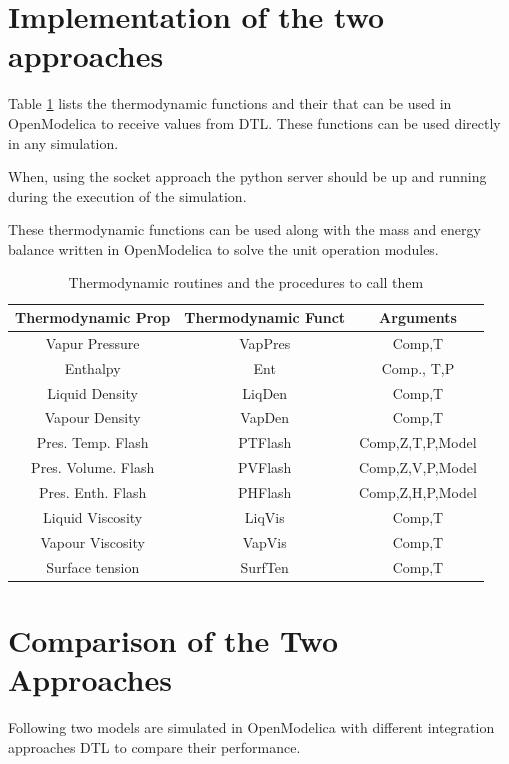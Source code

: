 \documentclass[12pt]{report}
\begin{document}
\section{Implementation of the two approaches}
Table \ref{Prop} lists the thermodynamic functions and their that can be used in OpenModelica to receive values from DTL. These functions can be used directly in any simulation. 

When, using the socket approach the python server should be up and running during the execution of the simulation. 

These thermodynamic functions can be used along with the mass and energy balance written in OpenModelica to solve the unit operation modules. 

\begin{table}
\label{Prop}
\caption{Thermodynamic routines and the procedures to call them}
\centering
\begin{tabular}{|c|c|c|} \hline
Thermodynamic Prop & Thermodynamic Funct & Arguments \\ \hline
Vapur Pressure & VapPres & Comp,T \\
Enthalpy & Ent & Comp., T,P \\
Liquid Density & LiqDen & Comp,T \\
Vapour Density & VapDen & Comp,T \\
Pres. Temp. Flash & PTFlash & Comp,Z,T,P,Model \\
Pres. Volume. Flash & PVFlash & Comp,Z,V,P,Model \\
Pres. Enth. Flash & PHFlash & Comp,Z,H,P,Model \\
Liquid Viscosity & LiqVis & Comp,T \\
Vapour Viscosity & VapVis & Comp,T \\
Surface tension & SurfTen & Comp,T \\ \hline
\end{tabular}
\end{table}

\section{Comparison of the Two Approaches}
Following two models are simulated in OpenModelica with different integration approaches DTL to compare their performance.
\end{document}
